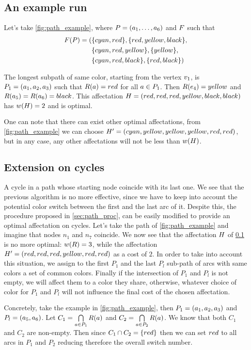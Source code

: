 \subsection{An example run}
\label{sec:path_ex_run}



Let's take \cref{fig:path_example}, where $P = (a_1,\ldots,a_{6})$ and $F$ such that
\begin{align*}
  F(P) = ( & \{cyan,red\}, \{red,yellow,black\},    \\
                   & \{cyan,red,yellow\}, \{yellow\},    \\
                   & \{cyan,red,black\}, \{red,black\}   )
\end{align*}

The longest subpath of same color, starting from the vertex $v_1$, is $P_1 = (a_1, a_2, a_3)$ such that $R(a) = red$ for all $a \in P_1$. Then $R(e_4) = yellow$ and $R(a_5) = R(a_6) = black$. This affectation $H = (red, red, red, yellow, black, black)$ has $w(H) = 2$ and is optimal.

One can note that there can exist other optimal affectations, from \cref{fig:path_example} we can choose $H' = (cyan, yellow, yellow, yellow, red, red)$, but in any case, any other affectations will not be less than  $w(H)$.

\subsection{Extension on cycles}

A cycle in a path whose starting node coincide with its last one.
We see that the previous algorithm is no more effective, since we have to keep into account the potential color switch between the first and the last arc of it.
Despite this, the procedure proposed in \cref{sec:path_proc}, can be easily modified to provide an optimal affectation on cycles.
Let's take the path of \cref{fig:path_example} and imagine that nodes $n_1$ and $n_7$ coincide.
We now see that the affectation $H$ of \cref{sec:path_ex_run} is no more optimal: $w(R) = 3$, while the affectation $H' = (red, red, red, yellow, red, red)$ as a cost of $2$.
In order to take into account this situation, we assign to the first $P_1$ and the last $P_l$ sub-path of arcs with same colors a set of common colors. Finally if the intersection of $P_1$ and $P_l$ is not empty, we will affect them to a color they share, otherwise, whatever choice of color for $P_1$ and $P_l$ will not influence the final cost of the chosen affectation.

Concretely, take the example in \cref{fig:path_example}, then $P_1 = (a_1, a_2, a_3)$ and $P_l = (a_5, a_6)$. Let $C_1 = \bigcap\limits_{a\in P_1} R(a)$ and $C_2 = \bigcap\limits_{a\in P_2} R(a)$. We know that both $C_1$ and $C_2$ are non-empty. Then since $C_1 \cap C_2 = \{red\}$ then we can set $red$ to all arcs in $P_1$ and $P_2$ reducing therefore the overall switch number.

